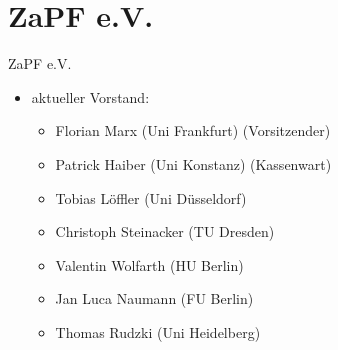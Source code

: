 \documentclass[compress, aspectratio=169]{beamer}
\begin{document}

\section{ZaPF e.V.}

\begin{frame}{ZaPF e.V.}
	\begin{itemize}
		\item[] aktueller Vorstand:
			\begin{itemize}
				\item Florian Marx (Uni Frankfurt) (Vorsitzender)
				\item Patrick Haiber (Uni Konstanz) (Kassenwart)
				\item Tobias Löffler (Uni Düsseldorf)
				\item Christoph Steinacker (TU Dresden)
				\item Valentin Wolfarth (HU Berlin) 
				\item Jan Luca Naumann (FU Berlin)
				\item Thomas Rudzki (Uni Heidelberg)
			\end{itemize}
	\end{itemize}
\end{frame} 
\end{document}
